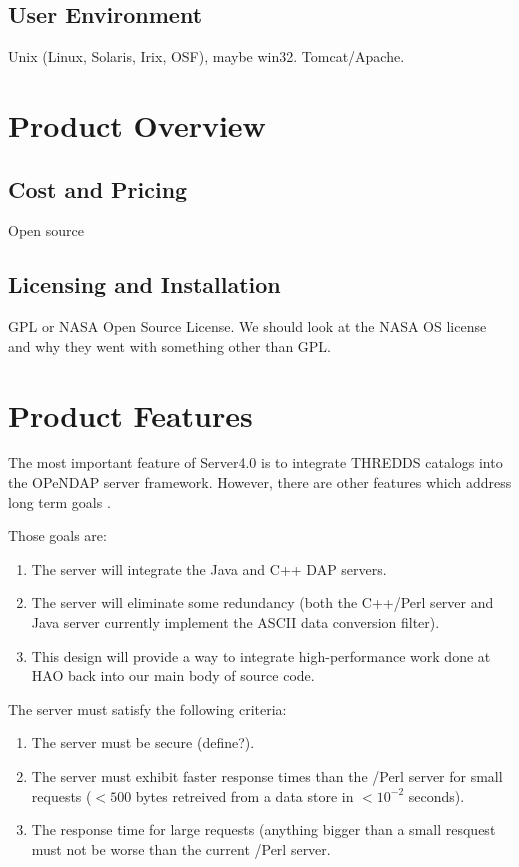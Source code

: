 \documentclass[justify]{dods-paper}
\begin{document}
\subsection{User Environment}

Unix (Linux, Solaris, Irix, OSF), maybe win32.
Tomcat/Apache.

\section{Product Overview}
\subsection{Cost and Pricing}

Open source

\subsection{Licensing and Installation}

GPL or NASA Open Source License. We should look at the NASA OS license and why they went with something other than GPL. 

\section{Product Features}

The most important feature of Server4.0 is to integrate THREDDS catalogs into the OPeNDAP server framework. However, there are other features which address long term goals \opendap.

Those goals are:
\begin{enumerate}
\item The server will integrate the Java and C++ DAP servers.
\item The server will eliminate some redundancy (both the C++/Perl server and Java server currently implement the ASCII data conversion filter).
\item This design will provide a way to integrate high-performance work done at HAO back into our main body of source code.
\end{enumerate}

The server must satisfy the following criteria:
\begin{enumerate}
\item The server must be secure (define?).
\item The server must exhibit faster response times than the \Cpp/Perl server for small requests ($<500$ bytes retreived from a data store in $<10^{-2}$ seconds).
\item The response time for large requests (anything bigger than a small resquest must not be worse than the current \Cpp/Perl server.
\end{enumerate}
\end{document}
